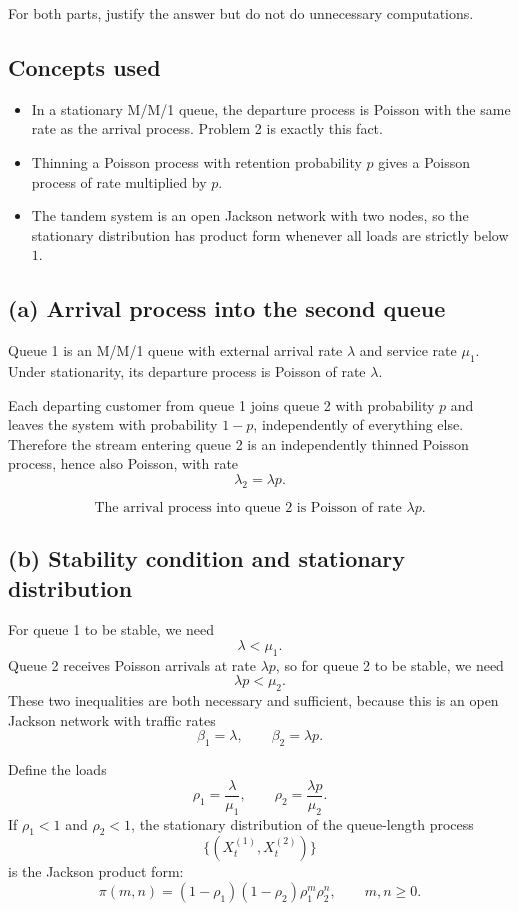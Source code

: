 \documentclass[11pt,a4paper]{article}
\newcommand{\1}{\mathbf{1}}
\begin{document}
For both parts, justify the answer but do not do unnecessary computations.

\subsection*{Concepts used}
\begin{itemize}
  \item In a stationary M/M/1 queue, the departure process is Poisson with the same rate as the arrival process. Problem 2 is exactly this fact.
  \item Thinning a Poisson process with retention probability $p$ gives a Poisson process of rate multiplied by $p$.
  \item The tandem system is an open Jackson network with two nodes, so the stationary distribution has product form whenever all loads are strictly below $1$.
\end{itemize}

\subsection*{(a) Arrival process into the second queue}
Queue 1 is an M/M/1 queue with external arrival rate $\lambda$ and service rate $\mu_1$. Under stationarity, its departure process is Poisson of rate $\lambda$.

Each departing customer from queue 1 joins queue 2 with probability $p$ and leaves the system with probability $1-p$, independently of everything else. Therefore the stream entering queue 2 is an independently thinned Poisson process, hence also Poisson, with rate
\[
\lambda_2=\lambda p.
\]

\[
\boxed{\text{The arrival process into queue 2 is Poisson of rate }\lambda p.}
\]

\subsection*{(b) Stability condition and stationary distribution}
For queue 1 to be stable, we need
\[
\lambda<\mu_1.
\]
Queue 2 receives Poisson arrivals at rate $\lambda p$, so for queue 2 to be stable, we need
\[
\lambda p<\mu_2.
\]
These two inequalities are both necessary and sufficient, because this is an open Jackson network with traffic rates
\[
\beta_1=\lambda,\qquad \beta_2=\lambda p.
\]

Define the loads
\[
\rho_1=\frac{\lambda}{\mu_1},\qquad \rho_2=\frac{\lambda p}{\mu_2}.
\]
If $\rho_1<1$ and $\rho_2<1$, the stationary distribution of the queue-length process
\[
\{(X_t^{(1)},X_t^{(2)})\}
\]
is the Jackson product form:
\[
\pi(m,n)=(1-\rho_1)(1-\rho_2)\rho_1^m\rho_2^n,\qquad m,n\ge 0.
\]
\end{document}
